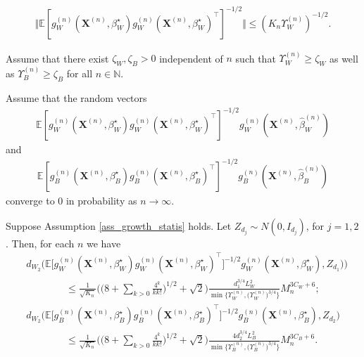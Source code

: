 \documentclass[10pt,a4paper]{amsart}
\begin{document}
 \begin{align} \label{weylbound}
     \Vert \mathbb{E}[g_W^{(n)}(\mathbf{X}^{(n)},\beta_W^{\star})g_W^{(n)}(\mathbf{X}^{(n)},\beta_W^{\star})^{\top}]^{-1/2} \Vert \leq {( K_n\Upsilon_W^{(n)})^{-1/2}}.
\end{align}

\begin{Assumption}  \label{ass_min_eig_sum}
Assume that there exist $\zeta_W,\zeta_B>0$ independent of $n$ such that $\Upsilon_W^{(n)} \geq \zeta_W$ as well as $\Upsilon_B^{(n)} \geq \zeta_B$
for all $n \in \mathbb{N}$.
\end{Assumption}

\begin{Assumption} \label{ass_conv_prob_remainder}
    Assume that the random vectors 
    \begin{align*}
         \mathbb{E}[g_W^{(n)}(\mathbf{X}^{(n)},\beta_W^{\star})g_W^{(n)}(\mathbf{X}^{(n)},\beta_W^{\star})^{\top}]^{-1/2} g_W^{(n)}(\mathbf{X}^{(n)},\hat{\beta}_W^{(n)})
    \end{align*}
    and 
    \begin{align*}
        \mathbb{E}[g_B^{(n)}(\mathbf{X}^{(n)},\beta_B^{\star})g_B^{(n)}(\mathbf{X}^{(n)},\beta_B^{\star})^{\top}]^{-1/2} g_B^{(n)}(\mathbf{X}^{(n)},\hat{\beta}_B^{(n)})
    \end{align*}
    converge to $0$ in probability as $n \rightarrow \infty$.
\end{Assumption}

\begin{Lemma} \label{lemma_clt_est_eq}
    Suppose Assumption \ref{ass_growth_statis} holds. Let ${Z}_{d_j} \sim N(0,I_{d_j})$, for $j=1, 2$.  Then, for each $n$ we have
    \begin{align*}
         &d_{W_2}\Big( \mathbb{E}\big[g_W^{(n)}(\mathbf{X}^{(n)},\beta_W^{\star})g_W^{(n)}(\mathbf{X}^{(n)},\beta_W^{\star})^{\top} \big]^{-1/2} g_W^{(n)}(\mathbf{X}^{(n)},\beta_W^{\star}) , {Z}_{d_1})  \Big) \\
         & \qquad \qquad \leq \frac{1}{\sqrt{K_n}} \bigg(\bigg( 8+\sum_{k>0} \frac{4^k}{kk!} \bigg)^{1/2} + \sqrt{2}\bigg) \frac{d_1^{3/4} L_W^2}{\min\big\{\Upsilon_W^{(n)},\big(\Upsilon_W^{(n)}\big)^{3/4}\big\}} { M_n^{3C_W+6} } ; \\
         &d_{W_2}\Big( \mathbb{E}\big[g_B^{(n)}(\mathbf{X}^{(n)},\beta_B^{\star})g_B^{(n)}(\mathbf{X}^{(n)},\beta_B^{\star})^{\top} \big]^{-1/2} g_B^{(n)}(\mathbf{X}^{(n)},\beta_B^{\star}) , {Z}_{d_2}  \Big) \\
         & \qquad \qquad \leq \frac{1}{\sqrt{K_n}} \bigg(\bigg( 8+\sum_{k>0} \frac{4^k}{kk!} \bigg)^{1/2} + \sqrt{2}\bigg) \frac{4d_2^{3/4} L_B^2}{\min\big\{\Upsilon_B^{(n)},\big(\Upsilon_B^{(n)}\big)^{3/4}\big\}} {M_n^{3C_B+6} }.
    \end{align*}
\end{Lemma}
\end{document}

